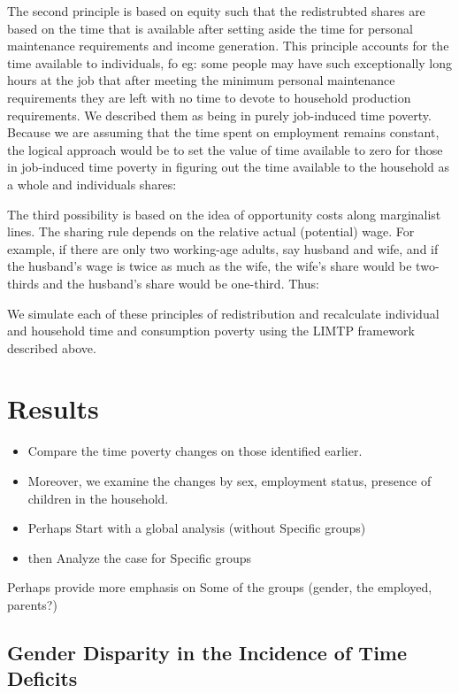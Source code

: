 \documentclass[
  11pt,
]{article}
\begin{document}
The second principle is based on equity such that the redistrubted
shares are based on the time that is available after setting aside the
time for personal maintenance requirements and income generation. This
principle accounts for the time available to individuals, fo eg: some
people may have such exceptionally long hours at the job that after
meeting the minimum personal maintenance requirements they are left with
no time to devote to household production requirements. We described
them as being in purely job-induced time poverty. Because we are
assuming that the time spent on employment remains constant, the logical
approach would be to set the value of time available to zero for those
in job-induced time poverty in figuring out the time available to the
household as a whole and individuals shares:

The third possibility is based on the idea of opportunity costs along
marginalist lines. The sharing rule depends on the relative actual
(potential) wage. For example, if there are only two working-age adults,
say husband and wife, and if the husband's wage is twice as much as the
wife, the wife's share would be two-thirds and the husband's share would
be one-third. Thus:

We simulate each of these principles of redistribution and recalculate
individual and household time and consumption poverty using the LIMTP
framework described above.

\section{Results}\label{results}

\begin{itemize}
\item
  Compare the time poverty changes on those identified earlier.
\item
  Moreover, we examine the changes by sex, employment status, presence
  of children in the household.
\item
  Perhaps Start with a global analysis (without Specific groups)
\item
  then Analyze the case for Specific groups
\end{itemize}

Perhaps provide more emphasis on Some of the groups (gender, the
employed, parents?)

\subsection{Gender Disparity in the Incidence of Time
Deficits}\label{gender-disparity-in-the-incidence-of-time-deficits}
\end{document}
